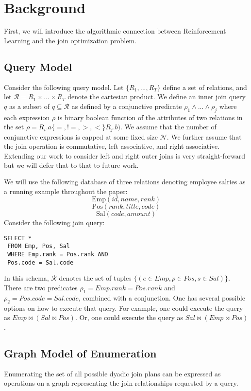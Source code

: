 \section{Background}
First, we will introduce the algorithmic connection between Reinforcement Learning and the join optimization problem.

\subsection{Query Model}
Consider the following query model.
Let $\{R_1,...,R_T\}$ define a set of relations, and let $\mathcal{R} = R_1 \times ... \times R_T$ denote the cartesian product.
We define an inner join query $q$ as a subset of $q \subseteq \mathcal{R}$ as defined by a conjunctive predicate $\rho_1 \wedge ... \wedge \rho_j$ where each expression $\rho$ is binary boolean function of the attributes of two relations in the set $\rho = R_i.a \{=,!=,>,<\} R_j.b)$. We assume that the number of conjunctive expressions is capped at some fixed size $\mathcal{N}$.
We further assume that the join operation is commutative, left associative, and right associative.
Extending our work to consider left and right outer joins is very straight-forward but we will defer that to that to future work.

We will use the following database of three relations denoting employee salries as a running example throughout the paper:
\[
\text{Emp}(id, name, rank)
\]
\[
\text{Pos}(rank, title, code)
\]
\[
\text{Sal}(code, amount)
\]
Consider the following join query:
\begin{lstlisting}
SELECT *
 FROM Emp, Pos, Sal
 WHERE Emp.rank = Pos.rank AND
 Pos.code = Sal.code
\end{lstlisting}
In this schema, $\mathcal{R}$ denotes the set of tuples $\{(e \in Emp, p \in Pos, s \in Sal)\}$. There are two predicates $\rho_1 = Emp.rank = Pos.rank$ and $\rho_2 = Pos.code = Sal.code$, combined with a conjunction. 
One has several possible options on how to execute that query. For example, one could execute the query as $Emp \bowtie (Sal \bowtie Pos)$. Or, one could execute the query as $Sal \bowtie (Emp \bowtie Pos)$. 

\subsection{Graph Model of Enumeration}
Enumerating the set of all possible dyadic join plans can be expressed as operations on a graph representing the join relationships requested by a query.

